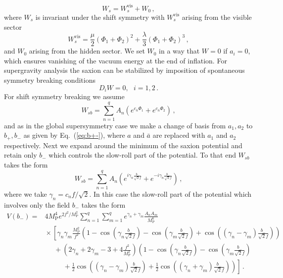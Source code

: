 \documentclass[12pt]{article}
\begin{document}
\begin{equation}
  W_s = W_s^\text{vis} + W_0\,,
\end{equation}
where $W_s$ is invariant under the shift symmetry with $W_s^\text{vis}$ arising from the visible sector
\begin{equation}
  W_s^\text{vis} =
      \frac{\mu}{2} \left(\Phi_1 + \Phi_2\right)^2
    + \frac{\lambda}{3} \left(\Phi_1 + \Phi_2\right)^3\,,
\end{equation}
and $W_0$ arising from the hidden sector. We set $W_0$ in a way that $W = 0$ if $a_i = 0$, which ensures vanishing of the vacuum energy at the end of inflation.
For supergravity analysis the saxion can be stabilized by imposition of spontaneous symmetry breaking conditions~\cite{Nath:1983aw}
\begin{equation}
  D_i W = 0,
  ~~~ i = 1, 2\,.
\end{equation}
For shift symmetry breaking we assume
\begin{equation}
  W_{sb} = \sum_{n = 1}^q A_n \left(e^{c_n \Phi_1} + e^{c_n \Phi_2}\right)\,,
\end{equation}
and as in the global supersymmetry case we make a change of basis from $a_1, a_2$ to $b_+, b_-$ as given by Eq.~(\ref{eq:b+-}), where $a$ and $\bar a$ are replaced with $a_1$ and $a_2$ respectively.
Next we expand around the minimum of the saxion potential and retain only $b_-$ which controls the slow-roll part of the potential.
To that end $W_{sb}$ takes the form
\begin{equation}
  W_{sb} = \sum_{n = 1}^q A_n \left(
      e^{i \gamma_n \frac{b_-}{\sqrt{2} f}}
    + e^{-i \gamma_n \frac{b_-}{\sqrt{2} f}}
  \right)\,,
\end{equation}
where we take $\gamma_n = c_n f / \sqrt{2}$.
In this case the slow-roll part of the potential which involves only the field $b_-$ takes the form
\begin{equation} \label{eq:supergravity:Vslow}
  \begin{aligned}
    V\left(b_-\right) =
      & 4 M_\text{P}^4 e^{2 f^2 / M_\text{P}^2} \sum_{n = 1}^q \sum_{m = 1}^q
        e^{\gamma_n + \gamma_m} \frac{A_n A_m}{M_\text{P}^6}\\
        &{} \times \left[
          \gamma_n \gamma_m \frac{M_\text{P}^2}{f^2} \left(
              1
            - \cos\left(\gamma_n \frac{b_-}{\sqrt{2} f}\right)
            - \cos\left(\gamma_m \frac{b_-}{\sqrt{2} f}\right)
            + \cos\left(\left(\gamma_n - \gamma_m\right) \frac{b_-}{\sqrt{2} f}\right)
          \right)\right.\\
          &~~~~~~ + \left(2 \gamma_n + 2 \gamma_m - 3 + 4 \frac{f^2}{M_\text{P}^2}\right) \left(
              1
            - \cos\left(\gamma_n \frac{b_-}{\sqrt{2} f}\right)
            - \cos\left(\gamma_m \frac{b_-}{\sqrt{2} f}\right)\right.\\
            &~~~~~~~~~~~~ \left.\left.{}
            + \frac{1}{2} \cos\left(\left(\gamma_n - \gamma_m\right) \frac{b_-}{\sqrt{2} f}\right)
            + \frac{1}{2} \cos\left(\left(\gamma_n + \gamma_m\right) \frac{b_-}{\sqrt{2} f}\right)
          \right)
        \right]\,.
  \end{aligned}
\end{equation}
\end{document}
